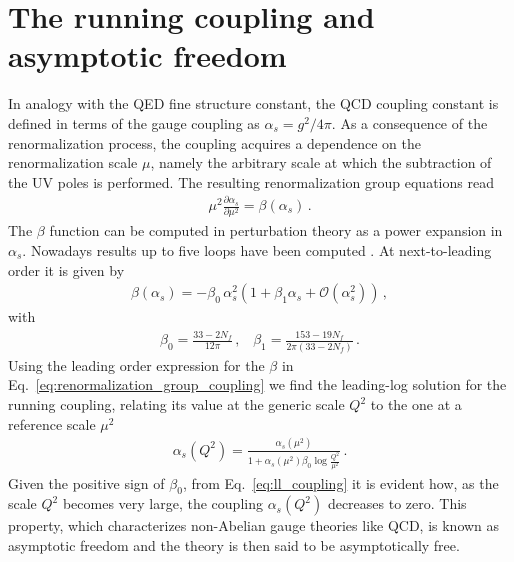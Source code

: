 

\section{The running coupling and asymptotic freedom}
%
In analogy with the QED fine structure constant,
the QCD coupling constant is defined in terms of the gauge coupling as $\alpha_s = g^2/4\pi$.
As a consequence of the renormalization process, the coupling acquires a dependence on the renormalization scale $\mu$,
namely the arbitrary scale at which the subtraction of the UV poles is performed. 
The resulting renormalization group equations read
\begin{align}
    \label{eq:renormalization_group_coupling}
    \mu^2\frac{\partial\alpha_s}{\partial \mu^2} = \beta\left(\alpha_s\right)\,.
\end{align}
The $\beta$ function can be computed in perturbation theory as a power expansion in $\alpha_s$. 
Nowadays results up to five loops have been computed \cite{Herzog:2017ohr}.
At next-to-leading order it is given by
\begin{align}
    \label{eq:beta_function_expansion}
    \beta\left(\alpha_s\right) = -\beta_0\,\alpha_s^2\left(1+ \beta_1 \alpha_s + \mathcal{O}\left(\alpha_s^2\right)\right)\,,
\end{align}
with
\begin{align}
    \label{eq:beta_function_coefficients}
    \beta_0 = \frac{33 - 2 N_f}{12\pi}\,,\,\,\,\,\,
    \beta_1 = \frac{153 -19 N_f}{2\pi\left(33-2 N_f\right)}\,.
\end{align}
Using the leading order expression for the $\beta$ in Eq.~\ref{eq:renormalization_group_coupling} we find the leading-log
solution for the running coupling, relating its value at the generic scale $Q^2$ to the one at a reference scale
$\mu^2$ 
\begin{align}
    \label{eq:ll_coupling}
    \alpha_s\left(Q^2\right) = \frac{\alpha_s\left(\mu^2\right)}{1+\alpha_s\left(\mu^2\right)\beta_0\log\frac{Q^2}{\mu^2}}\,.
\end{align}
Given the positive sign of $\beta_0$, from Eq.~\ref{eq:ll_coupling} it is evident how, as the scale $Q^2$ becomes very large, 
the coupling $\alpha_s\left(Q^2\right)$ decreases to zero. This property, which characterizes non-Abelian gauge theories 
like QCD, is known as asymptotic freedom and the theory is then said to be asymptotically free.
